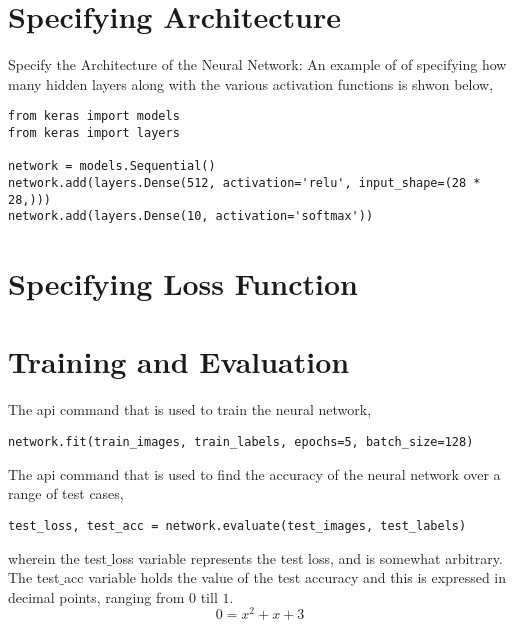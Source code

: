 \documentclass[a4paper, 12pt]{report}
\begin{document}
\begin{center}
\section*{Specifying Architecture}
\begin{comment}
\end{comment}
Specify the Architecture of the Neural Network:
An example of of specifying how many hidden layers along with the various activation functions is shwon below,
\begin{lstlisting}
from keras import models
from keras import layers

network = models.Sequential() 
network.add(layers.Dense(512, activation='relu', input_shape=(28 * 28,))) 
network.add(layers.Dense(10, activation='softmax')) 
\end{lstlisting}
\section*{Specifying Loss Function}
\begin{comment}
\end{comment}

\section*{Training and Evaluation}
\begin{comment}
\end{comment}

The api command that is used to train the neural network,
\begin{lstlisting}
network.fit(train_images, train_labels, epochs=5, batch_size=128)
\end{lstlisting}

The api command that is used to find the accuracy of the neural network over a range of test cases,
\begin{lstlisting}
test_loss, test_acc = network.evaluate(test_images, test_labels)
\end{lstlisting}
wherein the test$\_$loss variable represents the test loss, and is somewhat arbitrary. The test$\_$acc variable holds the value of the test accuracy and this is expressed in decimal points, ranging from $0$ till $1$.
$$0 = x^2 + x + 3$$
\end{center}
\end{document}

